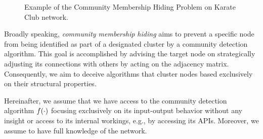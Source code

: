 
\begin{figure*}[t]
    \centering
    \hfill
    \hfill
    \caption{Example of the Community Membership Hiding Problem on Karate Club network.}
    \label{fig:cmh_example}
    \vspace{-3mm}
\end{figure*}



Broadly speaking, \textit{community membership hiding} aims to prevent a specific node from being identified as part of a designated cluster by a community detection algorithm. This goal is accomplished by advising the target node on strategically adjusting its connections with others by acting on the adjacency matrix. Consequently, we aim to deceive algorithms that cluster nodes based exclusively on their structural properties.

Hereinafter, we assume that we have access to the community detection algorithm $f(\cdot)$ focusing exclusively on its input-output behavior without any insight or access to its internal workings, e.g., by accessing its APIs. Moreover, we assume to have full knowledge of the network.


